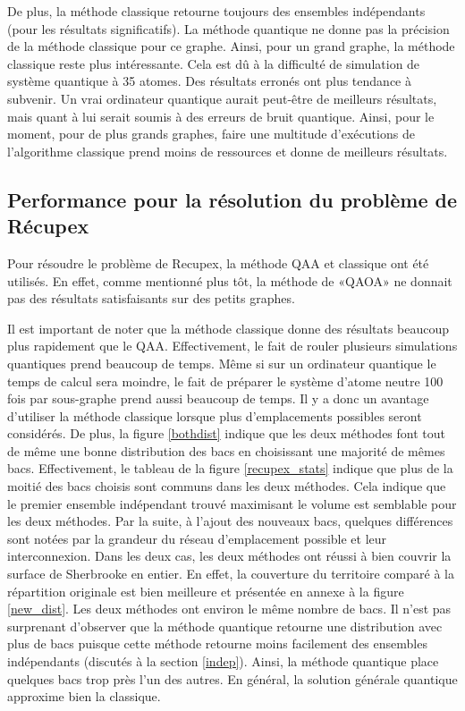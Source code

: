 \documentclass[11pt]{article}
\begin{document}
De plus, la méthode classique retourne toujours des ensembles indépendants (pour les résultats significatifs). La méthode quantique ne donne pas la précision de la méthode classique pour ce graphe. Ainsi, pour un grand graphe, la méthode classique reste plus intéressante. Cela est dû à la difficulté de simulation de système quantique à 35 atomes. Des résultats erronés ont plus tendance à subvenir. Un vrai ordinateur quantique aurait peut-être de meilleurs résultats, mais quant à lui serait soumis à des erreurs de bruit quantique. Ainsi, pour le moment, pour de plus grands graphes, faire une multitude d'exécutions de l'algorithme classique prend moins de ressources et donne de meilleurs résultats.

\subsection{Performance pour la résolution du problème de Récupex}
Pour résoudre le problème de Recupex, la méthode QAA et classique ont été utilisés. En effet, comme mentionné plus tôt, la méthode de «QAOA» ne donnait pas des résultats satisfaisants sur des petits graphes. 

Il est important de noter que la méthode classique donne des résultats beaucoup plus rapidement que le QAA. Effectivement, le fait de rouler plusieurs simulations quantiques prend beaucoup de temps. Même si sur un ordinateur quantique le temps de calcul sera moindre, le fait de préparer le système d'atome neutre 100 fois par sous-graphe prend aussi beaucoup de temps. Il y a donc un avantage d'utiliser la méthode classique lorsque plus d'emplacements possibles seront considérés. De plus, la figure \ref{bothdist} indique que les deux méthodes font tout de même une bonne distribution des bacs en choisissant une majorité de mêmes bacs. Effectivement, le tableau de la figure \ref{recupex_stats} indique que plus de la moitié des  bacs choisis sont communs dans les deux méthodes. Cela indique que le premier ensemble indépendant trouvé maximisant le volume est semblable pour les deux méthodes.  Par la suite, à l'ajout des nouveaux bacs, quelques différences sont notées par la grandeur du réseau d'emplacement possible et leur interconnexion. Dans les deux cas, les deux méthodes ont réussi à bien couvrir la surface de Sherbrooke en entier. En effet, la couverture du territoire comparé à la répartition originale est bien meilleure et présentée en annexe à la figure \ref{new_dist}. Les deux méthodes ont environ le même nombre de bacs. Il n'est pas surprenant d'observer que la méthode quantique retourne une distribution avec plus de bacs puisque cette méthode retourne moins facilement des ensembles indépendants (discutés à la section \ref{indep}). Ainsi, la méthode quantique place quelques bacs trop près l'un des autres. En général, la solution générale quantique approxime bien la classique.
\end{document}
